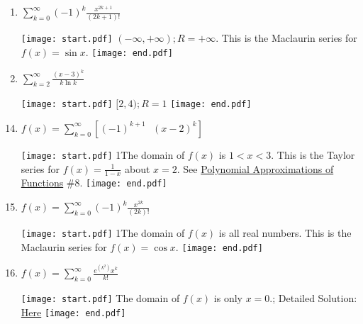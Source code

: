 \documentclass[12pt]{article}
\begin{document}
\begin{enumerate}
\item $\sum_{k=0}^{\infty}{(-1)^k\frac{x^{2k+1}}{(2k+1)!}}$

\texttt{[image: start.pdf]}
{{$(-\infty, +\infty); R=+\infty$.  This is the Maclaurin series for $f(x)=\sin{x}$.}}
\texttt{[image: end.pdf]}


\item $\sum_{k=2}^{\infty}{\frac{(x-3)^k}{k\ln{k}}}$

\texttt{[image: start.pdf]}
{{$[2, 4); R = 1$}}
\texttt{[image: end.pdf]}


\end{enumerate}

\begin{enumerate}
\setcounter{enumi}{13}

\item $f(x)=\sum_{k=0}^{\infty}{\left[(-1)^{k+1} \text{ } (x-2)^k\right] }$

\texttt{[image: start.pdf]}
{{{1\linewidth}{The domain of $f(x)$ is $1<x<3$.  This is the Taylor series for $f(x)=\frac{1}{1-x}$ about $x=2$.  See \underline{Polynomial Approximations of Functions} \#8.  }}}
\texttt{[image: end.pdf]}


\item $f(x)=\sum_{k=0}^{\infty}{(-1)^k\frac{x^{2k}}{(2k)!} }$

\texttt{[image: start.pdf]}
{{{1\linewidth}{The domain of $f(x)$ is all real numbers.  This is the Maclaurin series for $f(x)=\cos{x}$.}}}
\texttt{[image: end.pdf]}


\item $f(x)=\sum_{k=0}^{\infty}{\frac{e^{(k^2)}x^k}{k!} }$

\texttt{[image: start.pdf]}
{{The domain of $f(x)$ is only $x=0$.; Detailed Solution: \textcolor{blue}{\href{http://www.math.drexel.edu/classes/Calculus/resources/Math123HW/Solutions/123_12_Power_Series_16.pdf}{Here}}}}
\texttt{[image: end.pdf]}



\end{enumerate}
\end{document}
